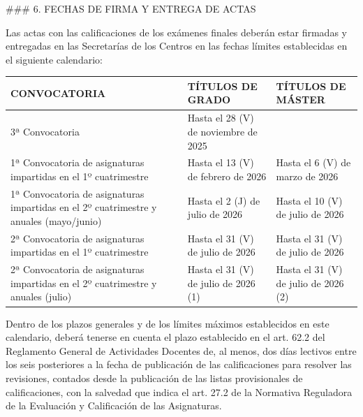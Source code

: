 \documentclass{article}
\begin{document}
\begin{itemize}
\begin{itemize}
\begin{scriptsize}
                  \#\#\# 6. FECHAS DE FIRMA Y ENTREGA DE ACTAS

                  Las actas con las calificaciones de los exámenes finales deberán estar firmadas y entregadas en las Secretarías de los Centros en las fechas límites establecidas en el siguiente calendario:

                  \vspace{0.4cm}
                  \begin{table}[h!]\centering\renewcommand{\arraystretch}{1.3}
                    \begin{tabular}{|p{}|p{}|p{}|}\hline
                      CONVOCATORIA                                                                           & TÍTULOS DE GRADO                     & TÍTULOS DE MÁSTER                    \\\hline
                      3ª Convocatoria                                                                        & Hasta el 28 (V) de noviembre de 2025 &                                      \\\hline
                      1ª Convocatoria de asignaturas impartidas en el 1º cuatrimestre                        & Hasta el 13 (V) de febrero de 2026   & Hasta el 6 (V) de marzo de 2026      \\\hline
                      1ª Convocatoria de asignaturas impartidas en el 2º cuatrimestre y anuales (mayo/junio) & Hasta el 2 (J) de julio de 2026      & Hasta el 10 (V) de julio de 2026     \\\hline
                      2ª Convocatoria de asignaturas impartidas en el 1º cuatrimestre                        & Hasta el 31 (V) de julio de 2026     & Hasta el 31 (V) de julio de 2026     \\\hline
                      2ª Convocatoria de asignaturas impartidas en el 2º cuatrimestre y anuales (julio)      & Hasta el 31 (V) de julio de 2026 (1) & Hasta el 31 (V) de julio de 2026 (2) \\\hline
                    \end{tabular}\end{table}
                  \vspace{0.4cm}

                  Dentro de los plazos generales y de los límites máximos establecidos en este calendario, deberá tenerse en cuenta el plazo establecido en el art. 62.2 del Reglamento General de Actividades Docentes de, al menos, dos días lectivos entre los seis posteriores a la fecha de publicación de las calificaciones para resolver las revisiones, contados desde la publicación de las listas provisionales de calificaciones, con la salvedad que indica el art. 27.2 de la Normativa Reguladora de la Evaluación y Calificación de las Asignaturas.


\end{scriptsize}
\end{itemize}
\end{itemize}
\end{document}
